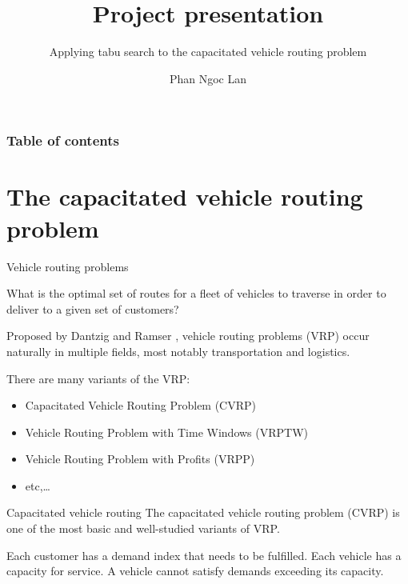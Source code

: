 \documentclass[9pt]{beamer}
\title{Project presentation}
\subtitle{Applying tabu search to the capacitated vehicle routing problem}
\author{Phan Ngoc Lan}
\institute{Hanoi University of Science and Technology}
\begin{document}

\titlepage

\begin{frame}
 \frametitle{Table of contents}
 \tableofcontents
\end{frame}

\section{The capacitated vehicle routing problem}
\begin{frame}{Vehicle routing problems}
\begin{block}{}
    What is the optimal set of routes for a fleet of vehicles to traverse in order to deliver to a given set of customers?
\end{block}

Proposed by Dantzig and Ramser \cite{dantzig1959truck}, vehicle routing problems (VRP) occur naturally in multiple fields, most notably transportation and logistics.

There are many variants of the VRP:
\begin{itemize}
    \item Capacitated Vehicle Routing Problem (CVRP)
    \item Vehicle Routing Problem with Time Windows (VRPTW)
    \item Vehicle Routing Problem with Profits (VRPP)
    \item etc,\dots
\end{itemize}
\end{frame}

\begin{frame}{Capacitated vehicle routing}
The capacitated vehicle routing problem (CVRP) is one of the most basic and well-studied variants of VRP.

Each customer has a demand index that needs to be fulfilled. Each vehicle has a capacity for service. A vehicle cannot satisfy demands exceeding its capacity.
\end{frame}
\end{document}
